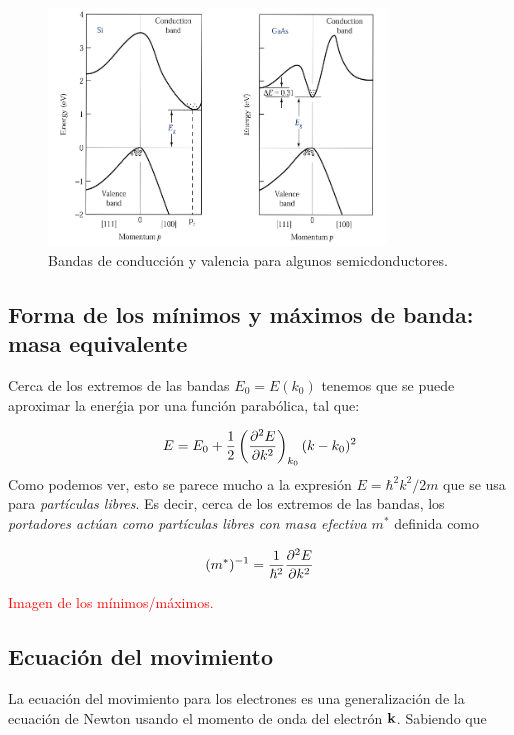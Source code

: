 \begin{figure}[h!] \centering
	\includegraphics[width=0.8\textwidth]{Cuerpo/Ch_01/01_02.png}
	\caption{Bandas de conducción y valencia para algunos semicdonductores.}
\end{figure}


\subsection{Forma de los mínimos y máximos de banda: masa equivalente}

Cerca de los extremos de las bandas $E_0=E(k_0)$ tenemos que se puede aproximar la enerǵia por una función parabólica, tal que:

\begin{equation}
	E = E_0 + \frac{1}{2} \left( \frac{\partial ^2E}{\partial k^2} \right)_{k_0} (k-k_0)^2 
\end{equation}
Como podemos ver, esto se parece mucho a la expresión $E=\hbar^2k^2/2m$ que se usa para \textit{partículas libres}. Es decir, cerca de los extremos de las bandas, los \textit{portadores actúan como partículas libres con masa efectiva $m^*$} definida como

\begin{equation}
	(m^*)^{-1} = \frac{1}{\hbar^2} \frac{\partial ^2E}{\partial k^2} 
\end{equation}

\begin{Anotacion}
	\textcolor{red}{Imagen de los mínimos/máximos.}
\end{Anotacion}

\subsection{Ecuación del movimiento}

La ecuación del movimiento para los electrones es una generalización de la ecuación de Newton usando el momento de onda del electrón $\mathbf{k}$. Sabiendo que 

